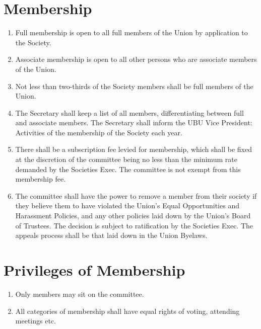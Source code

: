 \documentclass[a4paper,10pt]{article}
\begin{document}
\section{Membership}
\begin{enumerate}
  \item Full membership is open to all full members of the Union by application to the Society.
  \item Associate membership is open to all other persons who are associate members of the Union.
  \item Not less than two-thirds of the Society members shall be full members of the Union.
  \item The Secretary shall keep a list of all members, differentiating between full and associate members. The Secretary shall inform the UBU Vice President: Activities of the membership of the Society each year.
  \item There shall be a subscription fee levied for membership, which shall be fixed at the discretion of the committee being no less than the minimum rate demanded by the Societies Exec. The committee is not exempt from this membership fee.
  \item The committee shall have the power to remove a member from their society if they believe them to have violated the Union's Equal Opportunities and Harassment Policies, and any other policies laid down by the Union's Board of Trustees. The decision is subject to ratification by the Societies Exec. The appeals process shall be that laid down in the Union Byelaws.
\end{enumerate}

\section{Privileges of Membership}
\begin{enumerate}
  \item Only members may sit on the committee.
  \item All categories of membership shall have equal rights of voting, attending meetings etc.
\end{enumerate}
\end{document}
